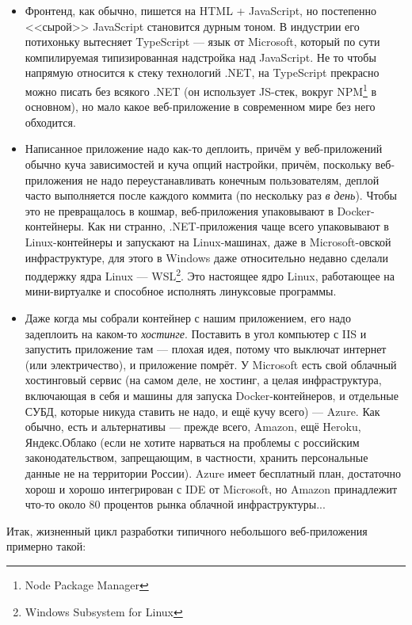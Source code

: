 \documentclass[a5paper]{article}
\begin{document}
\begin{itemize}
    \item Фронтенд, как обычно, пишется на HTML + JavaScript, но постепенно <<сырой>> JavaScript становится дурным тоном. В индустрии его потихоньку вытесняет TypeScript --- язык от Microsoft, который по сути компилируемая типизированная надстройка над JavaScript. Не то чтобы напрямую относится к стеку технологий .NET, на TypeScript прекрасно можно писать без всякого .NET (он использует JS-стек, вокруг NPM\footnote{Node Package Manager} в основном), но мало какое веб-приложение в современном мире без него обходится.
    \item Написанное приложение надо как-то деплоить, причём у веб-приложений обычно куча зависимостей и куча опций настройки, причём, поскольку веб-приложения не надо переустанавливать конечным пользователям, деплой часто выполняется после каждого коммита (по нескольку раз \emph{в день}). Чтобы это не превращалось в кошмар, веб-приложения упаковывают в Docker-контейнеры. Как ни странно, .NET-приложения чаще всего упаковывают в Linux-контейнеры и запускают на Linux-машинах, даже в Microsoft-овской инфраструктуре, для этого в Windows даже относительно недавно сделали поддержку ядра Linux --- WSL\footnote{Windows Subsystem for Linux}. Это настоящее ядро Linux, работающее на мини-виртуалке и способное исполнять линуксовые программы.
    \item Даже когда мы собрали контейнер с нашим приложением, его надо задеплоить на каком-то \emph{хостинге}. Поставить в угол компьютер с IIS и запустить приложение там --- плохая идея, потому что выключат интернет (или электричество), и приложение помрёт. У Microsoft есть свой облачный хостинговый сервис (на самом деле, не хостинг, а целая инфраструктура, включающая в себя и машины для запуска Docker-контейнеров, и отдельные СУБД, которые никуда ставить не надо, и ещё кучу всего) --- Azure. Как обычно, есть и альтернативы --- прежде всего, Amazon, ещё Heroku, Яндекс.Облако (если не хотите нарваться на проблемы с российским законодательством, запрещающим, в частности, хранить персональные данные не на территории России). Azure имеет бесплатный план, достаточно хорош и хорошо интегрирован с IDE от Microsoft, но Amazon принадлежит что-то около 80 процентов рынка облачной инфраструктуры...
\end{itemize}

Итак, жизненный цикл разработки типичного небольшого веб-приложения примерно такой:
\end{document}
